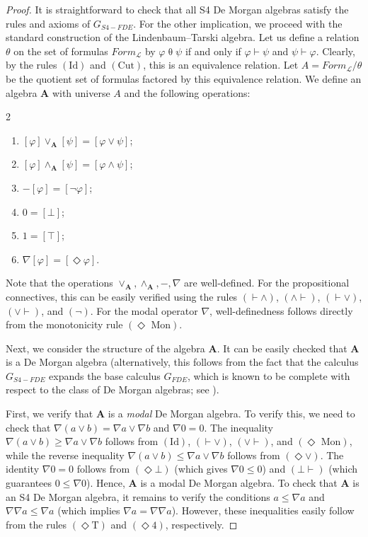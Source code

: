 \documentclass{amsart}
\theoremstyle{plain}
\newcommand{\rul}[1]{\ensuremath{\mathrm{(#1)}}}
\theoremstyle{definition}
\begin{document}
\begin{proof}
    It is straightforward to check that all S4 De Morgan algebras satisfy the rules and axioms of $G_{S4-FDE}$. For the other implication, we proceed with the standard construction of the Lindenbaum–Tarski algebra. Let us define a relation $\theta$ on the set of formulas $\mathit{Form}_{\mathcal{L}}$ by $\varphi \mathrel{\theta} \psi$ if and only if $\varphi \vdash \psi$ and $\psi \vdash \varphi$. Clearly, by the rules \rul{Id} and \rul{Cut}, this is an equivalence relation. Let $A = \mathit{Form}_{\mathcal{L}} / \theta$ be the quotient set of formulas factored by this equivalence relation. We define an algebra $\mathbf{A}$ with universe $A$ and the following operations:
\begin{multicols}{2}
\begin{enumerate}
    \item $[\varphi] \lor_{\mathbf{A}} [\psi] = [\varphi \lor \psi]$; 
    \item $[\varphi] \land_{\mathbf{A}} [\psi] = [\varphi \land \psi]$; 
    \item $-[\varphi] = [\neg \varphi]$; 
    \item $0 = [\bot]$; 
    \item $1 = [\top]$; 
    \item $\nabla[\varphi] = [\Diamond \varphi]$.
\end{enumerate}
\end{multicols}
    Note that the operations $\lor_{\mathbf{A}}, \land_{\mathbf{A}}, -, \nabla$ are well-defined. For the propositional connectives, this can be easily verified using the rules \rul{\vdash \land}, \rul{\land \vdash}, \rul{\vdash \lor}, \rul{\lor \vdash}, and \rul{\neg}. For the modal operator $\nabla$, well-definedness follows directly from the monotonicity rule \rul{\Diamond\text{ Mon}}.

    Next, we consider the structure of the algebra $\mathbf{A}$. It can be easily checked that $\mathbf{A}$ is a De Morgan algebra (alternatively, this follows from the fact that the calculus $G_{S4-FDE}$ expands the base calculus $G_{FDE}$, which is known to be complete with respect to the class of De Morgan algebras; see \cite{Font:BD}). 

    First, we verify that $\mathbf{A}$ is a \emph{modal} De Morgan algebra. To verify this, we need to check that $\nabla (a \lor b) = \nabla a \lor \nabla b$ and $\nabla 0 = 0$. The inequality $\nabla (a \lor b) \geq \nabla a \lor \nabla b$ follows from \rul{Id}, \rul{\vdash \lor}, \rul{\lor \vdash}, and \rul{\Diamond\text{ Mon}}, while the reverse inequality $\nabla (a \lor b) \leq \nabla a \lor \nabla b$ follows from \rul{\Diamond \lor}. The identity $\nabla 0 = 0$ follows from \rul{\Diamond \bot} (which gives $\nabla 0 \leq 0$) and \rul{\bot \vdash} (which guarantees $0 \leq \nabla 0$). Hence, $\mathbf{A}$ is a modal De Morgan algebra. To check that $\mathbf{A}$ is an S4 De Morgan algebra, it remains to verify the conditions $a \leq \nabla a$ and $\nabla \nabla a \leq \nabla a$ (which implies $\nabla a = \nabla \nabla a$). However, these inequalities easily follow from the rules \rul{\Diamond T} and \rul{\Diamond 4}, respectively.
\end{proof}
\end{document}
